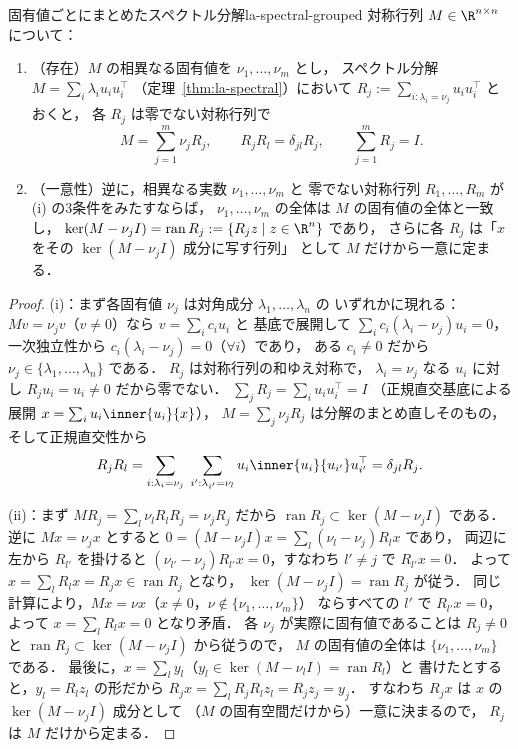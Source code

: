 \begin{claim}{固有値ごとにまとめたスペクトル分解}{la-spectral-grouped}
  対称行列 $M\in\R^{n\times n}$ について：
  \begin{enumerate}
    \item （存在）$M$ の相異なる固有値を $\nu_1,\dots,\nu_m$ とし，
      スペクトル分解 $M=\sum_i\lambda_iu_iu_i^\top$
      （定理~\ref{thm:la-spectral}）において
      $R_j:=\sum_{i:\lambda_i=\nu_j}u_iu_i^\top$ とおくと，
      各 $R_j$ は零でない対称行列で
      \[
        M=\sum_{j=1}^m\nu_jR_j,\qquad
        R_jR_l=\delta_{jl}R_j,\qquad
        \sum_{j=1}^mR_j=I.
      \]
    \item （一意性）逆に，相異なる実数 $\nu_1,\dots,\nu_m$ と
      零でない対称行列 $R_1,\dots,R_m$ が (i) の3条件をみたすならば，
      $\nu_1,\dots,\nu_m$ の全体は $M$ の固有値の全体と一致し，
      $\ker(M-\nu_jI)=\operatorname{ran}R_j
      :=\{R_jz\mid z\in\R^n\}$ であり，
      さらに各 $R_j$ は「$x$ をその $\ker(M-\nu_jI)$ 成分に写す行列」
      として $M$ だけから一意に定まる．
  \end{enumerate}
\end{claim}

\begin{proof}
  (i)：まず各固有値 $\nu_j$ は対角成分 $\lambda_1,\dots,\lambda_n$ の
  いずれかに現れる：$Mv=\nu_jv$（$v\neq0$）なら $v=\sum_ic_iu_i$ と
  基底で展開して $\sum_ic_i(\lambda_i-\nu_j)u_i=0$，
  一次独立性から $c_i(\lambda_i-\nu_j)=0$（$\forall i$）であり，
  ある $c_i\neq0$ だから $\nu_j\in\{\lambda_1,\dots,\lambda_n\}$ である．
  $R_j$ は対称行列の和ゆえ対称で，
  $\lambda_i=\nu_j$ なる $u_i$ に対し $R_ju_i=u_i\neq0$ だから零でない．
  $\sum_jR_j=\sum_iu_iu_i^\top=I$
  （正規直交基底による展開 $x=\sum_iu_i\inner{u_i}{x}$），
  $M=\sum_j\nu_jR_j$ は分解のまとめ直しそのもの，そして正規直交性から
  \[
    R_jR_l
    =\sum_{i:\lambda_i=\nu_j}\;\sum_{i':\lambda_{i'}=\nu_l}
      u_i\inner{u_i}{u_{i'}}u_{i'}^\top
    =\delta_{jl}R_j.
  \]

  (ii)：まず $MR_j=\sum_l\nu_lR_lR_j=\nu_jR_j$ だから
  $\operatorname{ran}R_j\subset\ker(M-\nu_jI)$ である．
  逆に $Mx=\nu_jx$ とすると
  $0=(M-\nu_jI)x=\sum_l(\nu_l-\nu_j)R_lx$ であり，
  両辺に左から $R_{l'}$ を掛けると
  $(\nu_{l'}-\nu_j)R_{l'}x=0$，すなわち $l'\neq j$ で $R_{l'}x=0$．
  よって $x=\sum_lR_lx=R_jx\in\operatorname{ran}R_j$ となり，
  $\ker(M-\nu_jI)=\operatorname{ran}R_j$ が従う．
  同じ計算により，$Mx=\nu x$（$x\neq0$，$\nu\notin\{\nu_1,\dots,\nu_m\}$）
  ならすべての $l'$ で $R_{l'}x=0$，よって $x=\sum_lR_lx=0$ となり矛盾．
  各 $\nu_j$ が実際に固有値であることは $R_j\neq0$ と
  $\operatorname{ran}R_j\subset\ker(M-\nu_jI)$ から従うので，
  $M$ の固有値の全体は $\{\nu_1,\dots,\nu_m\}$ である．
  最後に，$x=\sum_ly_l$（$y_l\in\ker(M-\nu_lI)=\operatorname{ran}R_l$）と
  書けたとすると，$y_l=R_lz_l$ の形だから
  $R_jx=\sum_lR_jR_lz_l=R_jz_j=y_j$．
  すなわち $R_jx$ は $x$ の $\ker(M-\nu_jI)$ 成分として
  （$M$ の固有空間だけから）一意に決まるので，
  $R_j$ は $M$ だけから定まる．
\end{proof}

